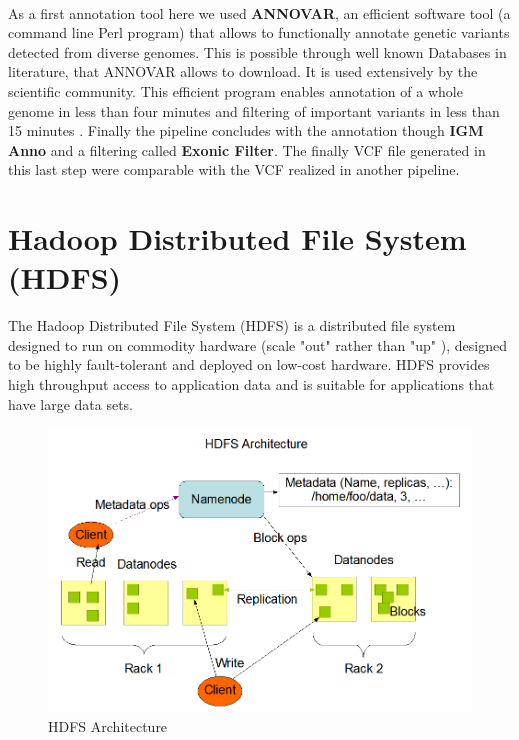 \\[1\baselineskip]
As a first annotation tool here we used \textbf{ANNOVAR}, an efficient software tool (a command line Perl program) that allows to functionally annotate genetic variants detected from diverse genomes. This is possible through well known Databases in literature, that ANNOVAR allows to download. It is used extensively by the scientific community. This efficient program enables annotation of a whole genome in less than four minutes and filtering of important variants in less than 15 minutes \cite{ANNOVAR}.
Finally the pipeline concludes with the annotation though \textbf{IGM Anno} and a filtering called \textbf{Exonic Filter}. The finally VCF file generated in this last step were comparable with the VCF realized in another pipeline.

\section{Hadoop Distributed File System (HDFS)}
The Hadoop Distributed File System (HDFS) is a distributed file system designed to run on commodity hardware (scale "out" rather than "up" ), designed to be highly fault-tolerant and deployed on low-cost hardware. HDFS provides high throughput access to application data and is suitable for applications that have large data sets.
\begin{figure}[h] 
\begin{center}
\includegraphics[scale=0.4]{figure/HadoopArch.png}
\end{center}
\caption{HDFS Architecture ~\label{services_swarm}}
\end{figure}
\\[1\baselineskip]
